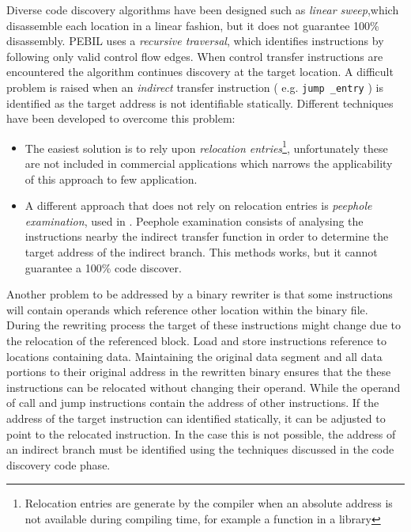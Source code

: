 Diverse code discovery algorithms have been designed such as \emph{linear sweep},which disassemble each location in a linear fashion, but it does not guarantee 100\% disassembly. PEBIL uses a \emph{recursive traversal}, which identifies instructions by following only valid control flow edges. When control transfer instructions are encountered the algorithm continues discovery at the target location. A difficult problem is raised when an \emph{indirect} transfer instruction  ( e.g. \lstinline$jump _entry$ ) is identified as the target address is not identifiable statically. Different techniques have been developed to overcome this problem: 
\begin{itemize}
\item The easiest solution is to rely upon \emph{relocation entries}\footnote{Relocation entries are generate by the compiler when an absolute address is not available during compiling time, for example a function in a library}, unfortunately these are not included in commercial applications which narrows the applicability of this approach to few application. %

\item A different approach that does not rely on relocation entries is \emph{peephole examination},  used  in \cite{PEBIL}. Peephole examination consists of analysing the instructions nearby the indirect transfer function  in order to determine the target address of the indirect branch. This methods works, but it cannot guarantee a 100\% code discover. 
\end{itemize}  
    

Another problem to be addressed by a binary rewriter is that some instructions will contain operands which reference other location within the binary file. During the rewriting process the target of these instructions might change due to the relocation of the referenced block. Load and store instructions reference to locations containing data. Maintaining the original data segment and all data portions to their original address in the rewritten binary ensures that the these instructions can be relocated without changing their operand. While the operand of call and jump instructions contain the address of other instructions. If the address of the target instruction can identified statically, it can be adjusted to point to the relocated instruction. In the case this is not possible, the address of an indirect branch must be identified using the techniques discussed in the code discovery code phase. 

